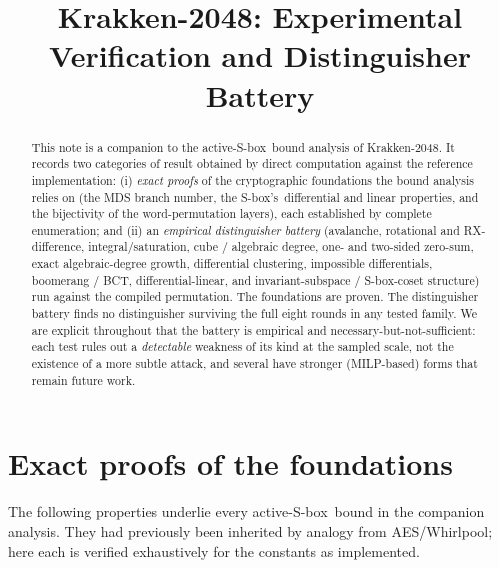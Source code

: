 \documentclass[11pt]{article}
\title{Krakken-2048: Experimental Verification and Distinguisher Battery}
\author{}
\date{}
\newcommand{\sbx}{S\nobreakdash-box}
\begin{document}
\maketitle

\begin{abstract}
This note is a companion to the active-\sbx\ bound analysis of Krakken-2048. It
records two categories of result obtained by direct computation against the
reference implementation: (i) \emph{exact proofs} of the cryptographic
foundations the bound analysis relies on (the MDS branch number, the \sbx's\
differential and linear properties, and the bijectivity of the word-permutation
layers), each established by complete enumeration; and (ii) an \emph{empirical
distinguisher battery} (avalanche, rotational and RX-difference,
integral/saturation, cube / algebraic degree, one- and two-sided zero-sum, exact
algebraic-degree growth, differential clustering, impossible differentials,
boomerang / BCT, differential-linear, and invariant-subspace / \sbx-coset
structure) run against the compiled
permutation. The foundations are proven. The distinguisher battery finds no
distinguisher surviving the full eight rounds in any tested family. We are
explicit throughout that the battery is empirical and necessary-but-not-sufficient:
each test rules out a \emph{detectable} weakness of its kind at the sampled
scale, not the existence of a more subtle attack, and several have stronger
(MILP-based) forms that remain future work.
\end{abstract}

\section{Exact proofs of the foundations}

The following properties underlie every active-\sbx\ bound in the companion
analysis. They had previously been inherited by analogy from AES/Whirlpool; here
each is verified exhaustively for the constants as implemented.
\end{document}
